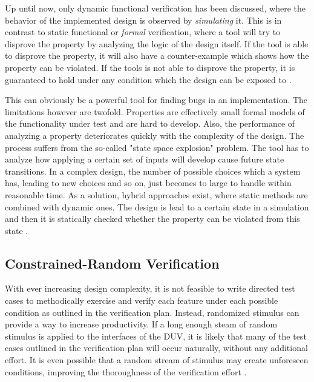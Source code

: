 \documentclass[11pt,a4paper]{report}
\begin{document}
Up until now, only dynamic functional verification has been discussed, where the behavior of the implemented design
is observed by \textit{simulating} it. This is in contrast to static functional or \textit{formal} verification,
where a tool will try to disprove the property by analyzing the logic of the design itself. If the tool is able to
disprove the property, it will also have a counter-example which shows how the property can be violated. If the tools
is not able to disprove the property, it is guaranteed to hold under any condition which the design can be exposed to
\cite[Ch. 14]{mehta2021introduction}.

This can obviously be a powerful tool for finding bugs in an implementation. The limitations however are twofold.
Properties are effectively small formal models of the functionality under test and are hard to develop. Also, the
performance of analyzing a property deteriorates quickly with the complexity of the design. The process suffers from
the so-called "state space explosion" problem. The tool has to analyze how applying a certain set of inputs will
develop cause future state transitions. In a complex design, the number of possible choices which a system has,
leading to new choices and so on, just becomes to large to handle within reasonable time. As a solution, hybrid
approaches exist, where static methods are combined with dynamic ones. The design is lead to a certain state in a
simulation and then it is statically checked whether the property can be violated from this state \cite[Ch.
14]{mehta2021introduction}.

\subsection{Constrained-Random Verification} %

With ever increasing design complexity, it is not feasible to write directed test cases to methodically exercise and
verify each feature under each possible condition as outlined in the verification plan. Instead, randomized stimulus
can provide a way to increase productivity. If a long enough steam of random stimulus is applied to the interfaces of
the DUV, it is likely that many of the test cases outlined in the verification plan will occur naturally, without any
additional effort. It is even possible that a random stream of stimulus may create unforeseen conditions, improving
the thoroughness of the verification effort \cite[Ch. 1]{bergeron2005verification}.
\end{document}
